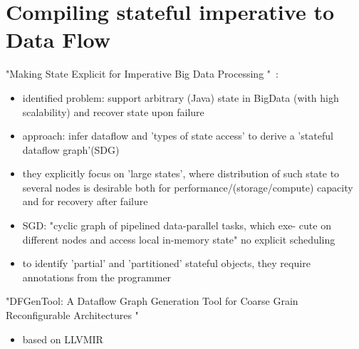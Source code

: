 \section{Compiling stateful imperative to Data Flow}
"Making State Explicit for Imperative Big Data Processing
"~\cite{fernandez2014making}:
\begin{itemize}
    \item identified problem: support arbitrary (Java) state in BigData (with high scalability) and recover state upon failure
    \item approach: infer dataflow and 'types of state access' to derive a 'stateful dataflow graph'(SDG)
    \item they explicitly focus on 'large states', where distribution of such state to several nodes is desirable both for performance/(storage/compute) capacity and for recovery after failure 
    \item SGD: "cyclic graph of pipelined data-parallel tasks, which exe-
cute on different nodes and access local in-memory state" \means no explicit scheduling
\item to identify 'partial' and 'partitioned' stateful objects, they require annotations from the programmer
\end{itemize}

"DFGenTool: A Dataflow Graph Generation Tool for Coarse Grain Reconfigurable Architectures "~\cite{mukherjee2017dfgentool}
\begin{itemize}
    \item based on LLVMIR
\end{itemize}